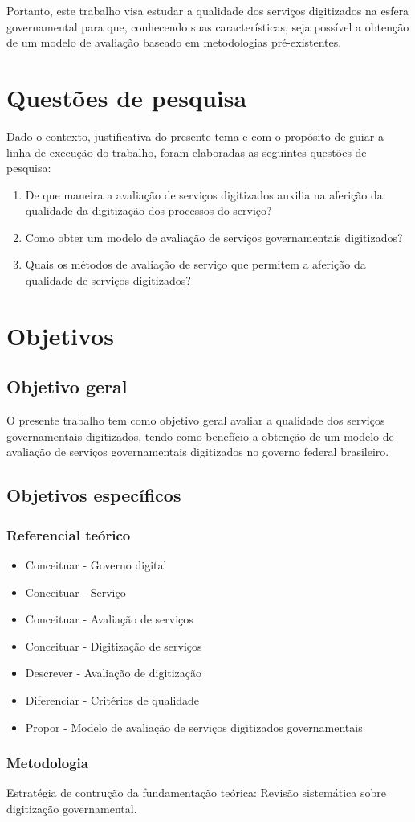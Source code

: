 Portanto, este trabalho visa estudar a qualidade dos serviços digitizados na esfera governamental para que, conhecendo suas características, seja possível a obtenção de um modelo de avaliação baseado em metodologias pré-existentes. 


\section{Questões de pesquisa}

Dado o contexto, justificativa do presente tema e com o propósito de guiar a linha de execução do trabalho, foram elaboradas as seguintes questões de pesquisa:
\begin{enumerate}
	\item De que maneira a avaliação de serviços digitizados auxilia na aferição da qualidade da digitização dos processos do serviço?

	\item Como obter um modelo de avaliação de serviços governamentais digitizados?

	\item Quais os métodos de avaliação de serviço que permitem a aferição da qualidade de serviços digitizados?
\end{enumerate}

\section{Objetivos}
\subsection{Objetivo geral}
	O presente trabalho tem como objetivo geral avaliar a qualidade dos serviços governamentais digitizados, tendo como benefício a obtenção de um modelo de avaliação de serviços governamentais digitizados no governo federal brasileiro.

\subsection{Objetivos específicos}

\subsubsection{Referencial teórico}
\begin{itemize}
\item 	Conceituar - Governo digital
\item	Conceituar - Serviço
\item	Conceituar - Avaliação de serviços
\item	Conceituar - Digitização de serviços
\item	Descrever - Avaliação de digitização
\item	Diferenciar - Critérios de qualidade
\item 	Propor - Modelo de avaliação de serviços digitizados governamentais
\end{itemize}

\subsubsection{Metodologia}
	Estratégia de contrução da fundamentação teórica:
		Revisão sistemática sobre digitização governamental.
